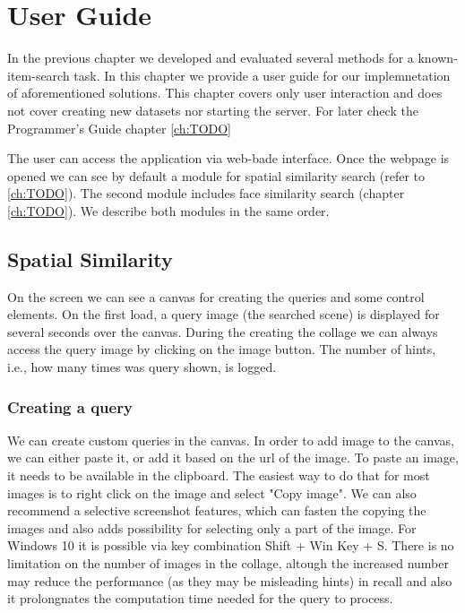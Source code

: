 \chapter{User Guide}

In the previous chapter we developed and evaluated several methods for a known-item-search task. In this chapter we provide a user guide for our implemnetation of aforementioned solutions. This chapter covers only user interaction and does not cover creating new datasets nor starting the server. For later check the Programmer's Guide chapter \ref{ch:TODO}

The user can access the application via web-bade interface. Once the webpage is opened we can see by default a module for spatial similarity search (refer to \ref{ch:TODO}). The second module includes face similarity search (chapter \ref{ch:TODO}). We describe both modules in the same order.

\section{Spatial Similarity}

On the screen we can see a canvas for creating the queries and some control elements. On the first load, a query image (the searched scene) is displayed for several seconds over the canvas. During the creating the collage we can always access the query image by clicking on the image button. The number of hints, i.e., how many times was query shown, is logged. 

\subsection*{Creating a query}

We can create custom queries in the canvas. In order to add image to the canvas, we can either paste it, or add it based on the url of the image. To paste an image, it needs to be available in the clipboard. The easiest way to do that for most images is to right click on the image and select "Copy image". We can also recommend a selective screenshot features, which can fasten the copying the images and also adds possibility for selecting only a part of the image. For Windows 10 it is possible via key combination Shift + Win Key + S. There is no limitation on the number of images in the collage, altough the increased number may reduce the performance (as they may be misleading hints) in recall and also it prolongnates the computation time needed for the query to process.

